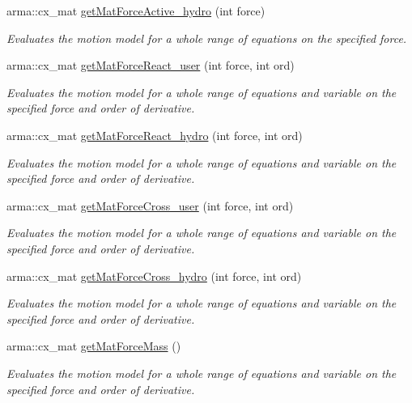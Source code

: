 \begin{DoxyCompactItemize}
arma\-::cx\-\_\-mat \hyperlink{classosea_1_1ofreq_1_1_motion_model_a56059a3d7f37c9dad5f906714ba159de}{get\-Mat\-Force\-Active\-\_\-hydro} (int force)
\begin{DoxyCompactList}\small\item\em Evaluates the motion model for a whole range of equations on the specified force. \end{DoxyCompactList}\item 
arma\-::cx\-\_\-mat \hyperlink{classosea_1_1ofreq_1_1_motion_model_a44e885c0255e74d82664c785499138f0}{get\-Mat\-Force\-React\-\_\-user} (int force, int ord)
\begin{DoxyCompactList}\small\item\em Evaluates the motion model for a whole range of equations and variable on the specified force and order of derivative. \end{DoxyCompactList}\item 
arma\-::cx\-\_\-mat \hyperlink{classosea_1_1ofreq_1_1_motion_model_af239389973af6d198a21ee0c07db19c6}{get\-Mat\-Force\-React\-\_\-hydro} (int force, int ord)
\begin{DoxyCompactList}\small\item\em Evaluates the motion model for a whole range of equations and variable on the specified force and order of derivative. \end{DoxyCompactList}\item 
arma\-::cx\-\_\-mat \hyperlink{classosea_1_1ofreq_1_1_motion_model_addbd875f2fc266823f645fc7f2d207e8}{get\-Mat\-Force\-Cross\-\_\-user} (int force, int ord)
\begin{DoxyCompactList}\small\item\em Evaluates the motion model for a whole range of equations and variable on the specified force and order of derivative. \end{DoxyCompactList}\item 
arma\-::cx\-\_\-mat \hyperlink{classosea_1_1ofreq_1_1_motion_model_a7d661c296c3fe5c97322a62cceabb5d4}{get\-Mat\-Force\-Cross\-\_\-hydro} (int force, int ord)
\begin{DoxyCompactList}\small\item\em Evaluates the motion model for a whole range of equations and variable on the specified force and order of derivative. \end{DoxyCompactList}\item 
arma\-::cx\-\_\-mat \hyperlink{classosea_1_1ofreq_1_1_motion_model_a7215db9f6f0c3e79f4559a4b9eadbcfc}{get\-Mat\-Force\-Mass} ()
\begin{DoxyCompactList}\small\item\em Evaluates the motion model for a whole range of equations and variable on the specified force and order of derivative. \end{DoxyCompactList}\item 

\end{DoxyCompactItemize}
